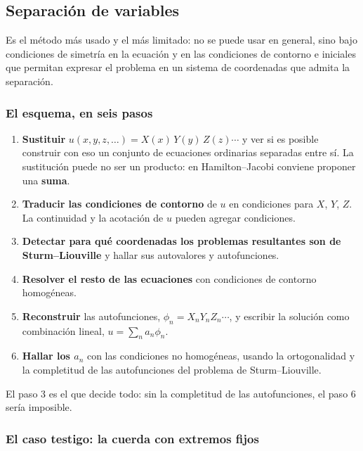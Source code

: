 \documentclass[
  spanish,
  a4paper,
]{scrbook}
\providecommand{\tightlist}{%
  \setlength{\itemsep}{0pt}\setlength{\parskip}{0pt}}
\theoremstyle{definition}
\theoremstyle{plain}
\theoremstyle{definition}
\theoremstyle{plain}
\theoremstyle{definition}
\theoremstyle{remark}
\begin{document}
\subsection{Separación de variables}\label{sec-resumen-9}

Es el método más usado y el más limitado: no se puede usar en general,
sino bajo condiciones de simetría en la ecuación y en las condiciones de
contorno e iniciales que permitan expresar el problema en un sistema de
coordenadas que admita la separación.

\subsubsection{El esquema, en seis
pasos}\label{el-esquema-en-seis-pasos}

\begin{enumerate}
\def\labelenumi{\arabic{enumi}.}
\tightlist
\item
  \textbf{Sustituir} \(u(x,y,z,\dots) = X(x)\,Y(y)\,Z(z)\cdots\) y ver
  si es posible construir con eso un conjunto de ecuaciones ordinarias
  separadas entre sí. La sustitución puede no ser un producto: en
  Hamilton--Jacobi conviene proponer una \textbf{suma}.
\item
  \textbf{Traducir las condiciones de contorno} de \(u\) en condiciones
  para \(X\), \(Y\), \(Z\). La continuidad y la acotación de \(u\)
  pueden agregar condiciones.
\item
  \textbf{Detectar para qué coordenadas los problemas resultantes son de
  Sturm--Liouville} y hallar sus autovalores y autofunciones.
\item
  \textbf{Resolver el resto de las ecuaciones} con condiciones de
  contorno homogéneas.
\item
  \textbf{Reconstruir} las autofunciones, \(\phi_n = X_nY_nZ_n\cdots\),
  y escribir la solución como combinación lineal,
  \(u = \sum_n a_n\phi_n\).
\item
  \textbf{Hallar los \(a_n\)} con las condiciones no homogéneas, usando
  la ortogonalidad y la completitud de las autofunciones del problema de
  Sturm--Liouville.
\end{enumerate}

El paso 3 es el que decide todo: sin la completitud de las
autofunciones, el paso 6 sería imposible.

\subsubsection{El caso testigo: la cuerda con extremos
fijos}\label{el-caso-testigo-la-cuerda-con-extremos-fijos}
\end{document}
